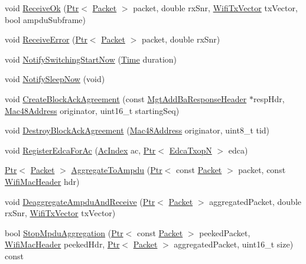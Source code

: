\begin{DoxyCompactItemize}
\item 
void \hyperlink{classns3_1_1MacLow_ade59e3a5e41c6ccbafd93501d7e9fbc0}{Receive\+Ok} (\hyperlink{classns3_1_1Ptr}{Ptr}$<$ \hyperlink{classns3_1_1Packet}{Packet} $>$ packet, double rx\+Snr, \hyperlink{classns3_1_1WifiTxVector}{Wifi\+Tx\+Vector} tx\+Vector, bool ampdu\+Subframe)
\item 
void \hyperlink{classns3_1_1MacLow_a657ff8ed7c720eaaa77ee77a674b6289}{Receive\+Error} (\hyperlink{classns3_1_1Ptr}{Ptr}$<$ \hyperlink{classns3_1_1Packet}{Packet} $>$ packet, double rx\+Snr)
\item 
void \hyperlink{classns3_1_1MacLow_a1952eb06064aac3eca3cd3edd426831b}{Notify\+Switching\+Start\+Now} (\hyperlink{classns3_1_1Time}{Time} duration)
\item 
void \hyperlink{classns3_1_1MacLow_ae772476fce0b730d2e5949bfa0287965}{Notify\+Sleep\+Now} (void)
\item 
void \hyperlink{classns3_1_1MacLow_ab70f7f727b5f9e1e1357a73e29ba7f82}{Create\+Block\+Ack\+Agreement} (const \hyperlink{classns3_1_1MgtAddBaResponseHeader}{Mgt\+Add\+Ba\+Response\+Header} $\ast$resp\+Hdr, \hyperlink{classns3_1_1Mac48Address}{Mac48\+Address} originator, uint16\+\_\+t starting\+Seq)
\item 
void \hyperlink{classns3_1_1MacLow_ada8f9b5da9cbfb2a63b1d740ab88216d}{Destroy\+Block\+Ack\+Agreement} (\hyperlink{classns3_1_1Mac48Address}{Mac48\+Address} originator, uint8\+\_\+t tid)
\item 
void \hyperlink{classns3_1_1MacLow_ad991474873a0ddb28e8a61a1b766958f}{Register\+Edca\+For\+Ac} (\hyperlink{group__wifi_gab422b4562ba272b39a9b6bca3513f3ac}{Ac\+Index} ac, \hyperlink{classns3_1_1Ptr}{Ptr}$<$ \hyperlink{classns3_1_1EdcaTxopN}{Edca\+TxopN} $>$ edca)
\item 
\hyperlink{classns3_1_1Ptr}{Ptr}$<$ \hyperlink{classns3_1_1Packet}{Packet} $>$ \hyperlink{classns3_1_1MacLow_a10d347ccf6a1e3868ee1470767ed38a6}{Aggregate\+To\+Ampdu} (\hyperlink{classns3_1_1Ptr}{Ptr}$<$ const \hyperlink{classns3_1_1Packet}{Packet} $>$ packet, const \hyperlink{classns3_1_1WifiMacHeader}{Wifi\+Mac\+Header} hdr)
\item 
void \hyperlink{classns3_1_1MacLow_a7380c5a3adcd88beda938bfa8447d7c5}{Deaggregate\+Ampdu\+And\+Receive} (\hyperlink{classns3_1_1Ptr}{Ptr}$<$ \hyperlink{classns3_1_1Packet}{Packet} $>$ aggregated\+Packet, double rx\+Snr, \hyperlink{classns3_1_1WifiTxVector}{Wifi\+Tx\+Vector} tx\+Vector)
\item 
bool \hyperlink{classns3_1_1MacLow_aead5c738f9be3650b2b55a1a307029db}{Stop\+Mpdu\+Aggregation} (\hyperlink{classns3_1_1Ptr}{Ptr}$<$ const \hyperlink{classns3_1_1Packet}{Packet} $>$ peeked\+Packet, \hyperlink{classns3_1_1WifiMacHeader}{Wifi\+Mac\+Header} peeked\+Hdr, \hyperlink{classns3_1_1Ptr}{Ptr}$<$ \hyperlink{classns3_1_1Packet}{Packet} $>$ aggregated\+Packet, uint16\+\_\+t size) const 

\end{DoxyCompactItemize}
